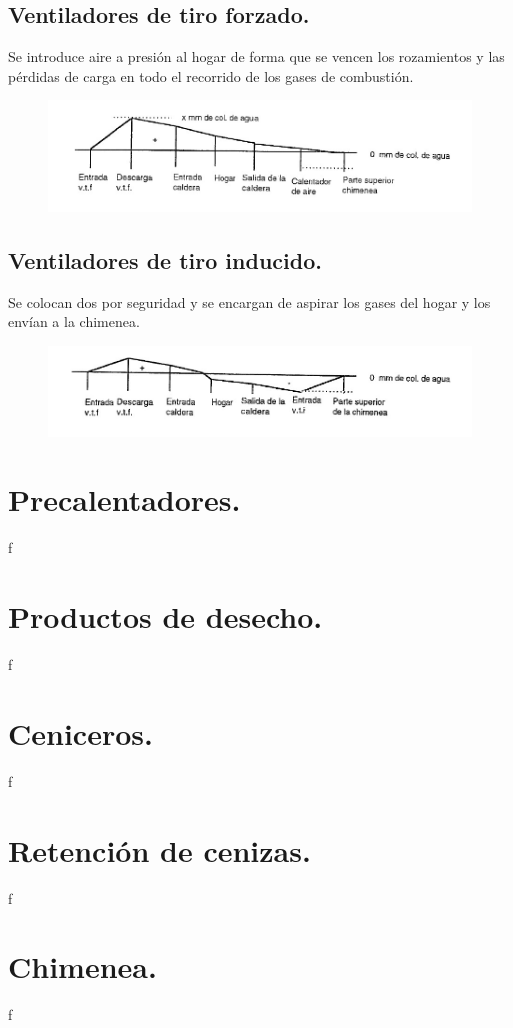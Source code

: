 \subsection{Ventiladores de tiro forzado.}
Se introduce aire a presión al hogar de forma que se vencen los rozamientos y las pérdidas de carga en todo el recorrido de los gases de combustión.
\begin{figure}[H]
	\centering
	\includegraphics[width=0.7\linewidth]{res/tema10/forzao}
	\label{fig:forzao}
\end{figure}

\subsection{Ventiladores de tiro inducido.}
Se colocan dos por seguridad y se encargan de aspirar los gases del hogar y los envían a la chimenea.
\begin{figure}[H]
	\centering
	\includegraphics[width=0.7\linewidth]{res/tema10/inducio}
	\label{fig:inducio}
\end{figure}

\section{Precalentadores.}
f
\section{Productos de desecho.}
f
\section{Ceniceros.}
f
\section{Retención de cenizas.}
f
\section{Chimenea.}
f
